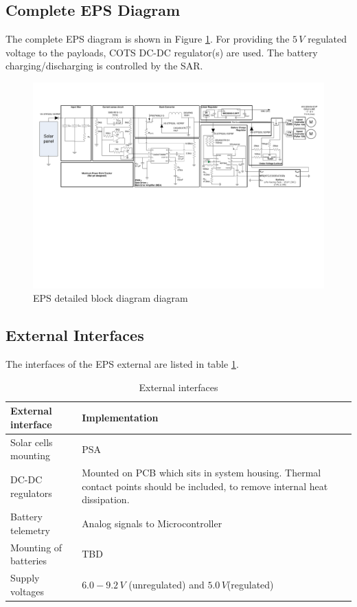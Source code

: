 \subsection{Complete EPS Diagram}
%
The complete \ac{EPS} diagram is shown in Figure \ref{fig:EPS_diagram_detailed}. For providing the $5\,V$ regulated voltage to the payloads, \ac{COTS} DC-DC regulator(s) are used. The battery charging/discharging is controlled by the \ac{SAR}.
%
\begin{figure}
\centering
\includegraphics[scale=0.8]{figures/fig_CDR_EPSdiagram_detailed}
\caption{\ac{EPS} detailed block diagram diagram}
\label{fig:EPS_diagram_detailed}
\end{figure}

%
\subsection{External Interfaces}
%
The interfaces of the \ac{EPS} external are listed in table \ref{tab:external_interfaces}.
%
\begin{table}[H]
\centering
\caption{External interfaces}
\label{tab:external_interfaces}
\begin{tabular}{m{}m{}}
\hline
\textbf{External interface} & \textbf{Implementation}\\
\hline
Solar cells mounting & \ac{PSA}\\[2mm]
DC-DC regulators & Mounted on PCB which sits in system housing. Thermal contact points should be included, to remove internal heat dissipation.\\[2mm]
Battery telemetry & Analog signals to Microcontroller\\[2mm]
Mounting of batteries & \ac{TBD}\\
Supply voltages & $6.0-9.2\,V$ (unregulated) and $5.0\,V$(regulated)\\[2mm]
\hline
\end{tabular}
\end{table}
%
%

